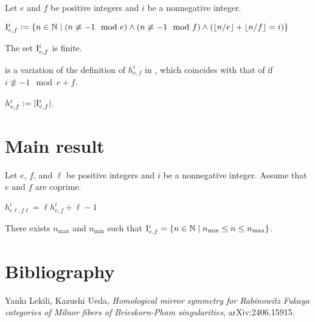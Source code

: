 Let $e$ and $f$ be positive integers
and $i$ be a nonnegative integer.

\begin{definition}
\label{def:setI}
\leanok
$
\mathrm{I}_{e,f}^i
:=
\{
n \in \mathbb{N}
\mid
(n \not \equiv - 1 \mod e)
\wedge
(n \not \equiv - 1 \mod f)
\wedge
(\lfloor n / e \rfloor + \lfloor n / f \rfloor = i)
\}
$
\end{definition}


\begin{lemma}
\label{lem:setI_finite}
\leanok
The set $\mathrm{I}_{e,f}^i$ is finite.
\end{lemma}


 is a variation
of the definition of $h_{e,f}^i$ in \cite{2406.15915},
which coincides with that of \cite{2406.15915}
if $i \not \equiv -1 \mod e+f$.

\begin{definition}
\label{def:h}
\leanok
{}
$
h_{e,f}^i
:=
|\mathrm{I}_{e,f}^i|
$.
\end{definition}

\chapter{Main result}

Let $e$, $f$, and $\ell$ be positive integers
and $i$ be a nonnegative integer.
Assume that $e$ and $f$ are coprime.

\begin{proposition}[{\cite[Proposition 5.1]{2406.15915}}]
\label{prop:main}
$
h_{e \ell, f \ell}^i = \ell h_{e,f}^i + \ell - 1
$
\end{proposition}

\begin{lemma} \label{lem:I_is_interval}
There exists $n_{\max}$ and $n_{\min}$ such that
$\mathrm{I}_{e,f}^i = \{n \in \mathbb{N} \mid n_{\min} \le n \le n_{\max}\}$.
\end{lemma}

\chapter{Bibliography}

\begin{thebibliography}{LU}
Yank{\i} Lekili, Kazushi Ueda,
\emph{Homological mirror symmetry for Rabinowitz Fukaya categories
of Milnor fibers of Brieskorn-Pham singularities},
arXiv:2406.15915.
\end{thebibliography}